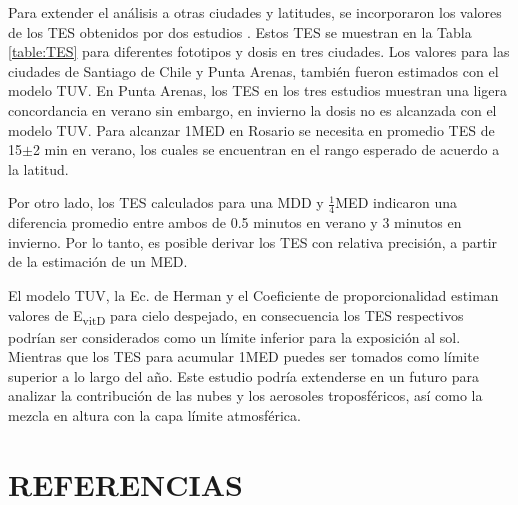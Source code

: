 \documentclass[10pt,twocolumn]{article}
\begin{document}
Para extender el análisis a otras ciudades y latitudes, se incorporaron los valores de los TES obtenidos por dos estudios \cite{Diaz2011,cabrera_radiacion_2005}. Estos TES se muestran en la Tabla \ref{table:TES} para diferentes fototipos y dosis en tres ciudades. Los valores para las ciudades de Santiago de Chile y Punta Arenas, también fueron estimados con el modelo TUV. En Punta Arenas, los TES en los tres estudios muestran una ligera concordancia en verano sin embargo, en invierno la dosis no es alcanzada con el modelo TUV. Para alcanzar 1MED en Rosario se necesita en promedio TES de 15$\pm$2 min en verano, los cuales se encuentran en el rango esperado de acuerdo a la latitud.

Por otro lado, los TES calculados para una MDD y $\frac{1}{4}$MED indicaron una diferencia promedio entre ambos de 0.5 minutos en verano y 3 minutos en invierno. Por lo tanto, es posible derivar los TES con relativa precisión, a partir de la estimación de un MED.

El modelo TUV, la Ec. de Herman y el Coeficiente de proporcionalidad estiman valores de E\textsubscript{vitD} para cielo despejado, en consecuencia los TES respectivos podrían ser considerados como un límite inferior para la exposición al sol. Mientras que los TES para acumular 1MED puedes ser tomados como límite superior a lo largo del año. Este estudio podría extenderse en un futuro para analizar la contribución de las nubes y los aerosoles troposféricos,\cite{Kim2020} así como la mezcla en altura con la capa límite atmosférica.
\section{REFERENCIAS}
\renewcommand{\refname}{}

\end{document}
